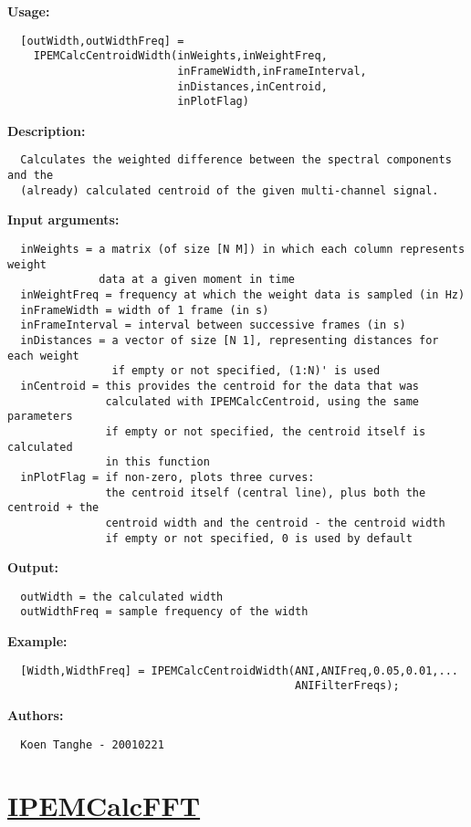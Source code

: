 \textbf{Usage:}
\begin{verbatim}  [outWidth,outWidthFreq] =
    IPEMCalcCentroidWidth(inWeights,inWeightFreq,
                          inFrameWidth,inFrameInterval,
                          inDistances,inCentroid,
                          inPlotFlag)

\end{verbatim}
\textbf{Description:}
\begin{verbatim}  Calculates the weighted difference between the spectral components and the
  (already) calculated centroid of the given multi-channel signal.

\end{verbatim}
\textbf{Input arguments:}
\begin{verbatim}  inWeights = a matrix (of size [N M]) in which each column represents weight
              data at a given moment in time
  inWeightFreq = frequency at which the weight data is sampled (in Hz)
  inFrameWidth = width of 1 frame (in s)
  inFrameInterval = interval between successive frames (in s)
  inDistances = a vector of size [N 1], representing distances for each weight
                if empty or not specified, (1:N)' is used
  inCentroid = this provides the centroid for the data that was
               calculated with IPEMCalcCentroid, using the same parameters
               if empty or not specified, the centroid itself is calculated
               in this function
  inPlotFlag = if non-zero, plots three curves:
               the centroid itself (central line), plus both the centroid + the
               centroid width and the centroid - the centroid width
               if empty or not specified, 0 is used by default

\end{verbatim}
\textbf{Output:}
\begin{verbatim}  outWidth = the calculated width
  outWidthFreq = sample frequency of the width

\end{verbatim}
\textbf{Example:}
\begin{verbatim}  [Width,WidthFreq] = IPEMCalcCentroidWidth(ANI,ANIFreq,0.05,0.01,...
                                            ANIFilterFreqs);

\end{verbatim}
\textbf{Authors:}
\begin{verbatim}  Koen Tanghe - 20010221
\end{verbatim}


\newpage
\section*{\hyperlink{Concepts:IPEMCalcFFT}{IPEMCalcFFT}}
\hypertarget{FuncRef:IPEMCalcFFT}{}


